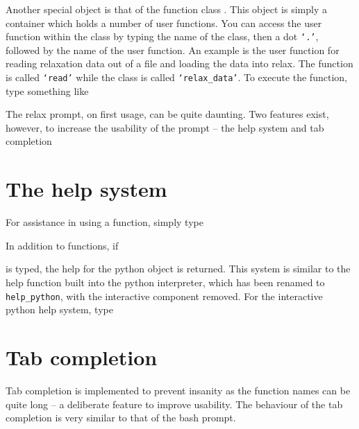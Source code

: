 
Another special object is that of the function class .  This object is simply a container which holds a number of user functions.  You can access the user function within the class by typing the name of the class, then a dot \texttt{`.'}, followed by the name of the user function.  An example is the user function for reading relaxation data out of a file and loading the data into relax.  The function is called \texttt{`read'} while the class is called \texttt{`relax\_data'}.  To execute the function, type something like


The relax prompt, on first usage, can be quite daunting.  Two features exist, however, to increase the usability of the prompt -- the help system and tab completion




\section{The help system}

For assistance in using a function, simply type


In addition to functions, if


is typed, the help for the python object is returned.  This system is similar to the help function built into the python interpreter, which has been renamed to \texttt{help\_python}, with the interactive component removed.  For the interactive python help system, type






\section{Tab completion}

Tab completion is implemented to prevent insanity as the function names can be quite long -- a deliberate feature to improve usability.  The behaviour of the tab completion is very similar to that of the bash prompt.

